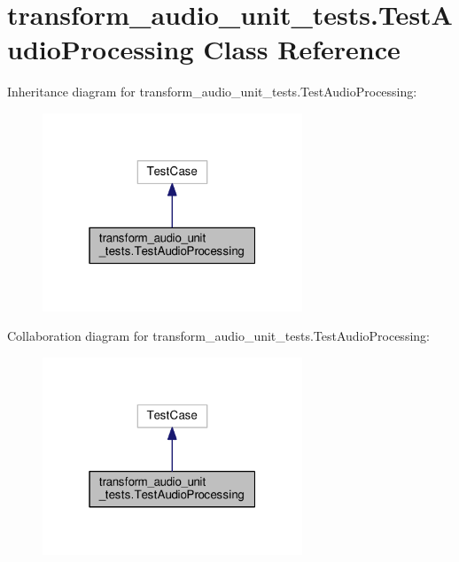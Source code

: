 \hypertarget{classtransform__audio__unit__tests_1_1TestAudioProcessing}{\section{transform\-\_\-audio\-\_\-unit\-\_\-tests.\-Test\-Audio\-Processing Class Reference}
\label{classtransform__audio__unit__tests_1_1TestAudioProcessing}
}


Inheritance diagram for transform\-\_\-audio\-\_\-unit\-\_\-tests.\-Test\-Audio\-Processing\-:
\nopagebreak
\begin{figure}[H]
\begin{center}
\leavevmode
\includegraphics[width=220pt]{classtransform__audio__unit__tests_1_1TestAudioProcessing__inherit__graph}
\end{center}
\end{figure}


Collaboration diagram for transform\-\_\-audio\-\_\-unit\-\_\-tests.\-Test\-Audio\-Processing\-:
\nopagebreak
\begin{figure}[H]
\begin{center}
\leavevmode
\includegraphics[width=220pt]{classtransform__audio__unit__tests_1_1TestAudioProcessing__coll__graph}
\end{center}
\end{figure}
